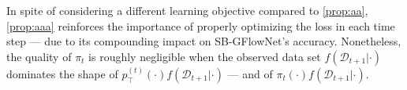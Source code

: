\documentclass{article}
\newcommand{\pp}[1]{\vspace{0pt}\noindent\textbf{#1}}
\theoremstyle{plain}
\theoremstyle{definition}
\theoremstyle{remark}
\theoremstyle{remark}
\begin{document}
In spite of considering a different learning objective compared to \autoref{prop:aa}, \autoref{prop:aaa} reinforces the importance of properly optimizing the loss in each time step --- due to its compounding impact on SB-GFlowNet's accuracy. Nonetheless, the quality of $\pi_{t}$ is roughly negligible when the observed data set $f(\mathcal{D}_{t + 1} | \cdot)$ dominates the shape of $p_{\top}^{(t)}(\cdot) f(\mathcal{D}_{t+1} | \cdot)$ --- and of $\pi_{t}(\cdot) f(\mathcal{D}_{t+1} | \cdot)$.






\end{document}
